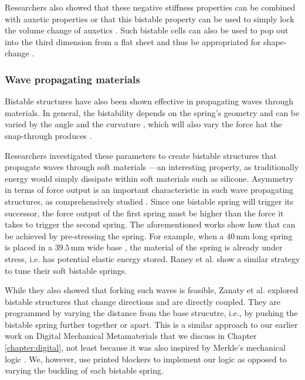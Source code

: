 {Researchers also showed that these negative stiffness properties can be combined with auxetic properties \cite{Hewage2016} or that this bistable property can be used to simply lock the volume change of auxetics \cite{Rafsanjani2016}. Such bistable cells can also be used to pop out into the third dimension from a flat sheet and thus be appropriated for shape-change \cite{Haghpanah2016, Chen2017}. 


\subsubsection{Wave propagating materials}

Bistable structures have also been shown effective in propagating waves through materials. In general, the bistability depends on the spring's geometry and can be varied by the angle \cite{Beharic2014} and the curvature \cite{Qiu2004}, which will also vary the force hat the snap-through produces \cite{Cazottes2009}. 

Researchers investigated these parameters to create bistable structures that propagate waves through soft materials \cite{Nadkarni2014, Raney2016}---an interesting property, as traditionally energy would simply dissipate within soft materials such as silicone. Asymmetry in terms of force output is an important characteristic in such wave propagating structures, as comprehensively studied \cite{Kidambi2017, Wu2018}. Since one bistable spring will trigger its successor, the force output of the first spring must be higher than the force it takes to trigger the second spring. The aforementioned works show how that can be achieved by pre-stressing the spring. For example, when a $40\, \mathrm{mm}$ long spring is placed in a $39.5\, \mathrm{mm}$ wide base \cite{Kidambi2017}, the material of the spring is already under stress, i.e. has potential elastic energy stored. Raney et al. \cite{Raney2016} show a similar strategy to tune their soft bistable springs. 

While they also showed that forking such waves is feasible, Zanaty et al. \cite{Zanaty2018} explored bistable structures that change directions and are directly coupled. They are programmed by varying the distance from the base strucutre, i.e., by pushing the bistable spring further together or apart. This is a similar approach to our earlier work on Digital Mechanical Metamaterials that we discuss in Chapter \ref{chapter:digital}, not least because it was also inspired by Merkle's mechanical logic \cite{Merkle1993}. We, however, use printed blockers to implement our logic as opposed to varying the buckling of each bistable spring. 

}
